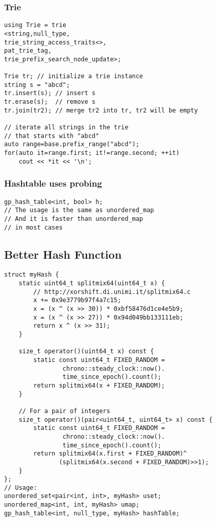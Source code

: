 \documentclass[10pt]{article}{\twocolumn}
\begin{document}
\subsubsection{Trie}
\begin{lstlisting}
using Trie = trie
<string,null_type,
trie_string_access_traits<>,
pat_trie_tag,
trie_prefix_search_node_update>;

Trie tr; // initialize a trie instance
string s = "abcd";
tr.insert(s); // insert s
tr.erase(s);  // remove s
tr.join(tr2); // merge tr2 into tr, tr2 will be empty

// iterate all strings in the trie 
// that starts with "abcd"
auto range=base.prefix_range("abcd");
for(auto it=range.first; it!=range.second; ++it)
    cout << *it << '\n';
\end{lstlisting}
\subsubsection{Hashtable uses probing}
\begin{lstlisting}
gp_hash_table<int, bool> h;
// The usage is the same as unordered_map
// And it is faster than unordered_map
// in most cases
\end{lstlisting}
\subsection{Better Hash Function}
\begin{lstlisting}
struct myHash {
    static uint64_t splitmix64(uint64_t x) {
        // http://xorshift.di.unimi.it/splitmix64.c
        x += 0x9e3779b97f4a7c15;
        x = (x ^ (x >> 30)) * 0xbf58476d1ce4e5b9;
        x = (x ^ (x >> 27)) * 0x94d049bb133111eb;
        return x ^ (x >> 31);
    }

    size_t operator()(uint64_t x) const {
        static const uint64_t FIXED_RANDOM =
                chrono::steady_clock::now().
                time_since_epoch().count();
        return splitmix64(x + FIXED_RANDOM);
    }

    // For a pair of integers
    size_t operator()(pair<uint64_t, uint64_t> x) const {
        static const uint64_t FIXED_RANDOM = 
                chrono::steady_clock::now().
                time_since_epoch().count();
        return splitmix64(x.first + FIXED_RANDOM)^
               (splitmix64(x.second + FIXED_RANDOM)>>1);
    }
};
// Usage:
unordered_set<pair<int, int>, myHash> uset;
unordered_map<int, int, myHash> umap;
gp_hash_table<int, null_type, myHash> hashTable;
\end{lstlisting}
\end{document}
